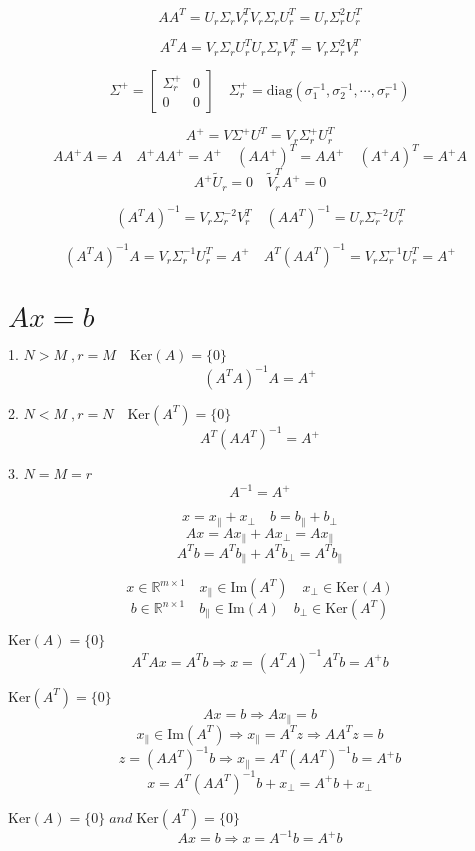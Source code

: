 \documentclass[12pt,a4paper]{article}
\begin{document}
\[
AA^T = U_r\Sigma_rV_r^TV_r\Sigma_rU_r^T = U_r\Sigma_r^2U_r^T
\]

\[
A^TA = V_r\Sigma_rU_r^TU_r\Sigma_rV_r^T = V_r\Sigma_r^2V_r^T
\]

\[
\Sigma^+ = \left[\begin{array}{cc}
\Sigma^+_r & 0 \\ 0 & 0
\end{array}
\right]\quad
\Sigma^+_r = \mathrm{diag}(\sigma_1^{-1},\sigma_2^{-1},\cdots,\sigma_r^{-1})
\]

\[
A^+=V\Sigma^+U^T = V_r\Sigma^+_rU^T_r
\]
\[
AA^+A = A \quad A^+AA^+ = A^+ \quad (AA^+)^T = AA^+ \quad (A^+A)^T = A^+A
\]
\[
A^+\tilde{U}_r = 0 \quad \tilde{V}^T_rA^+ = 0
\]

\[
(A^TA)^{-1} = V_r\Sigma_r^{-2}V_r^T 
\quad (AA^T)^{-1} = U_r\Sigma_r^{-2}U_r^T
\]

\[
(A^TA)^{-1}A = V_r\Sigma_r^{-1}U_r^T = A^+
\quad A^T(AA^T)^{-1} = V_r\Sigma_r^{-1}U_r^T  = A^+
\]

\section{$Ax = b$}
1. $N > M \;, r = M\quad \mathrm{Ker}(A) = \{0\}$
\[ (A^TA)^{-1}A = A^+\]

2. $N < M \;, r = N\quad \mathrm{Ker}(A^T) = \{0\}$
\[ A^T(AA^T)^{-1} =A^+\]

3. $N = M = r$
\[
	A^{-1} = A^+
\]

\[
x  = x_{\parallel}  + x_{\bot}  \quad b = b_{\parallel} + b_{\bot}
\]
\[
Ax  = Ax_{\parallel}  + Ax_{\bot} = Ax_{\parallel} 
\]
\[ A^Tb = A^Tb_{\parallel} + A^Tb_{\bot} = A^Tb_{\parallel}
\]

\[
x \in \mathbb{R}^{m \times 1} \quad x_{\parallel} \in \mathrm{Im}(A^T) \quad x_{\bot} \in \mathrm{Ker}(A)
\]
\[
b \in \mathbb{R}^{n \times 1} \quad b_{\parallel} \in \mathrm{Im}(A) \quad b_{\bot} \in \mathrm{Ker}(A^T)
\]

$\mathrm{Ker}(A) = \{0\}$
\[
A^TAx = A^Tb \Rightarrow x = (A^TA)^{-1}A^Tb = A^+b
\]

$\mathrm{Ker}(A^T) = \{0\}$
\[
Ax = b \Rightarrow Ax_{\parallel}=b \]
\[ x_{\parallel} \in \mathrm{Im}(A^T) \Rightarrow x_{\parallel} = A^Tz \Rightarrow AA^Tz = b
\]
\[
z = (AA^T)^{-1}b \Rightarrow x_{\parallel} = A^T(AA^T)^{-1}b = A^+b
\]
\[
x = A^T(AA^T)^{-1}b + x_{\bot}= A^+b + x_{\bot}
\]

$\mathrm{Ker}(A) = \{0\}\;and\;\mathrm{Ker}(A^T) = \{0\}$
\[
Ax = b \Rightarrow x = A^{-1}b = A^+b
\]
\end{document}
